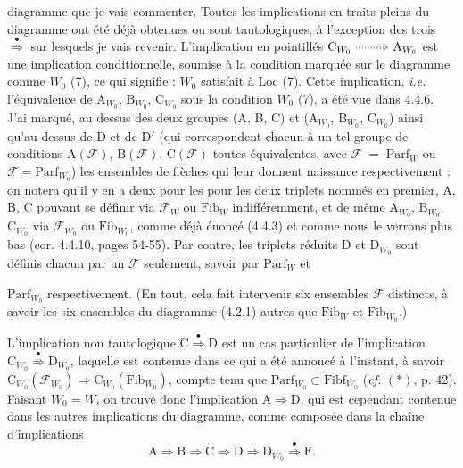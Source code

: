 \documentclass[11pt]{article}
\newcommand{\printedpage}[1]{\marginpar{\footnotesize p.~#1}}
\newcommand{\msp}[1]{\marginpar{\footnotesize [#1]}}
\newcommand{\Fib}{\mathrm{Fib}}
\newcommand{\Fibf}{\mathrm{Fibf}}
\newcommand{\Parf}{\mathrm{Parf}}
\newcommand{\cF}{\mathcal{F}}
\newcommand{\dottedimplies}{\mathrel{\tikz[baseline=-0.6ex]{\draw[dotted, double, double distance=1.5pt, -{Implies}] (0,0) -- (0.9,0);}}}
\newcommand{\dotimp}{\overset{\bullet}{\Longrightarrow}}
\begin{document}
diagramme que je vais commenter. Toutes les implications en traits pleins du diagramme ont été déjà obtenues ou sont tautologiques, à l'exception des trois $\overset{\bullet}{\Longrightarrow}$ sur lesquels je vais revenir. L'implication en pointillés $\mathrm{C}_{W_0} \dottedimplies \mathrm{A}_{W_0}$ est une implication conditionnelle, soumise à la condition marquée sur le diagramme comme $W_0$ (7), ce qui signifie : $W_0$ satisfait à Loc (7). Cette implication, \textit{i.e.} l'équivalence de $\mathrm{A}_{W_0}$, $\mathrm{B}_{W_0}$, $\mathrm{C}_{W_0}$ sous la condition $W_0$ (7), a été vue dans 4.4.6. J'ai marqué, au dessus des deux groupes (A, B, C) et ($\mathrm{A}_{W_0}$, $\mathrm{B}_{W_0}$, $\mathrm{C}_{W_0}$) ainsi qu'au dessus de D et de D$'$ (qui correspondent chacun à un tel groupe de conditions $\mathrm{A}(\cF)$, $\mathrm{B}(\cF)$, $\mathrm{C}(\cF)$ toutes équivalentes, avec $\cF \;=\; \Parf_W$ ou $\cF = \Parf_{W_0}$) les
\msp{page 49}
ensembles de flèches qui leur donnent naissance respectivement : on notera qu'il y en a deux pour les pour les deux triplets nommés en premier, A, B, C pouvant se définir via $\cF_W$ ou $\Fib_W$ indifféremment, et de même $\mathrm{A}_{W_0}$, $\mathrm{B}_{W_0}$, $\mathrm{C}_{W_0}$ via $\cF_{W_0}$ ou $\Fib_{W_0}$, comme déjà énoncé (4.4.3) et comme nous le verrons plus bas (cor. 4.4.10, pages 54-55). Par contre, les triplets réduits D et $\mathrm{D}_{W_0}$ sont définis chacun par un $\cF$ seulement, savoir par $\Parf_W$ et %

\setcounter{footnote}{30}

\printedpage{29}
$\Parf_{W_0}$ respectivement. (En tout, cela fait intervenir six ensembles $\mathcal{F}$ distincts, à savoir les six ensembles du diagramme (4.2.1) autres que $\Fib_W$ et $\Fib_{W_0}$.)

L'implication non tautologique $\mathrm{C} \dotimp \mathrm{D}$ est un cas particulier de l'implication $\mathrm{C}_{W_0} \dotimp \mathrm{D}_{W_0}$, laquelle est contenue dans ce qui a été annoncé à l'instant, à savoir $\mathrm{C}_{W_0}(\mathcal{F}_{W_0}) \Longrightarrow \mathrm{C}_{W_0}(\Fib_{W_0})$, compte tenu que $\Parf_{W_0} \subset \Fibf_{W_0}$ (\textit{cf.} $(*)$, p. 42). Faisant
\msp{page 50}
$W_0 = W$, on trouve donc l'implication $\mathrm{A} \Longrightarrow \mathrm{D}$, qui est cependant contenue dans les autres implications du diagramme, comme composée dans la chaîne d'implications
\[
\mathrm{A} \Longrightarrow \mathrm{B} \Longrightarrow \mathrm{C} \Longrightarrow \mathrm{D} \Longrightarrow \mathrm{D}_{W_0} \dotimp \mathrm{F}.
\]
\end{document}
